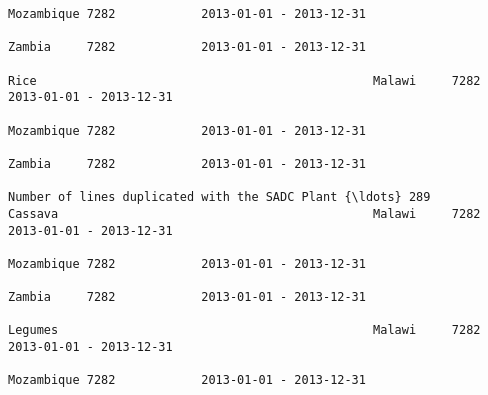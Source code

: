 \documentclass[11pt]{article}
\begin{document}
\begin{Verbatim}[commandchars=\\\{\}]
                                                                                                                                                                                                                 Mozambique 7282            2013-01-01 - 2013-12-31   
                                                                                                                                                                                                                 Zambia     7282            2013-01-01 - 2013-12-31   
                                                                                                                                                              Rice                                               Malawi     7282            2013-01-01 - 2013-12-31   
                                                                                                                                                                                                                 Mozambique 7282            2013-01-01 - 2013-12-31   
                                                                                                                                                                                                                 Zambia     7282            2013-01-01 - 2013-12-31   
                                                                         Number of lines duplicated with the SADC Plant {\ldots} 289                               Cassava                                            Malawi     7282            2013-01-01 - 2013-12-31   
                                                                                                                                                                                                                 Mozambique 7282            2013-01-01 - 2013-12-31   
                                                                                                                                                                                                                 Zambia     7282            2013-01-01 - 2013-12-31   
                                                                                                                                                              Legumes                                            Malawi     7282            2013-01-01 - 2013-12-31   
                                                                                                                                                                                                                 Mozambique 7282            2013-01-01 - 2013-12-31   

\end{Verbatim}
\end{document}
